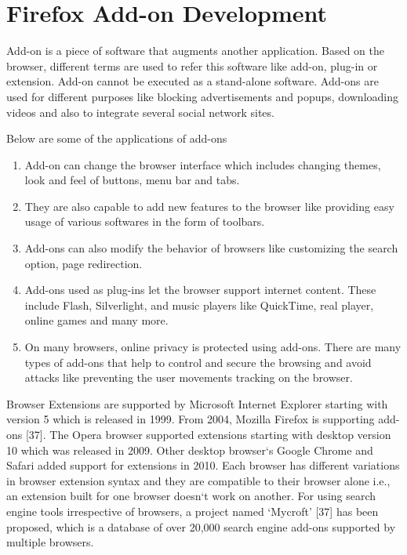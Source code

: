 \chapter{Firefox Add-on Development}

Add-on is a piece of software that augments another application. Based on the browser, different terms are used to refer this software like add-on, plug-in or extension. Add-on cannot be executed as a stand-alone software. Add-ons are used for different purposes like blocking advertisements and popups, downloading videos and also to integrate several social network sites. 

Below are some of the applications of add-ons
\begin{enumerate}
\item Add-on can change the browser interface which includes changing themes, look and feel of buttons, menu bar and tabs.
\item They are also capable to add new features to the browser like providing easy usage of various softwares in the form of toolbars. 
\item Add-ons can also modify the behavior of browsers like customizing the search option, page redirection. 
\item Add-ons used as plug-ins let the browser support internet content. These include Flash, Silverlight, and music players like QuickTime, real player, online games and many more. 
\item On many browsers, online privacy is protected using add-ons. There are many types of add-ons that help to control and secure the browsing and avoid attacks like preventing the user movements tracking on the browser.
\end{enumerate}

Browser Extensions are supported by Microsoft Internet Explorer starting with version 5 which is released in 1999. From 2004, Mozilla Firefox is supporting add-ons [37]. The Opera browser supported extensions starting with desktop version 10 which was released in 2009. Other desktop browser`s Google Chrome and Safari added support for extensions in 2010. Each browser has different variations in browser extension syntax and they are compatible to their browser alone i.e., an extension built for one browser doesn`t work on another. For using search engine tools irrespective of browsers, a project named `Mycroft' [37] has been proposed, which is a database of over 20,000 search engine add-ons supported by multiple browsers.

